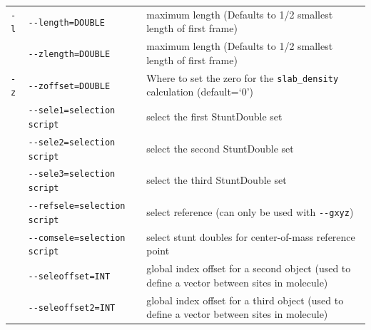 \documentclass[letterpaper]{report}
\begin{document}
\begin{longtable}[c]{|EFG|}
{\tt -l} & {\tt -{}-length=DOUBLE}           &  maximum length (Defaults to 1/2 smallest length of first frame) \\
    & {\tt -{}-zlength=DOUBLE}           &  maximum length (Defaults
                                           to 1/2 smallest length of
                                           first frame) \\
{\tt -z} & {\tt -{}-zoffset=DOUBLE}         & Where to set the zero for the
                                         {\tt slab\_density}
                                  calculation  (default=`0') \\
    & {\tt -{}-sele1=selection script}   & select the first StuntDouble set \\
    & {\tt -{}-sele2=selection script}   & select the second StuntDouble set \\
    & {\tt -{}-sele3=selection script}   & select the third StuntDouble set \\
    & {\tt -{}-refsele=selection script} & select reference (can only
    be used with {\tt -{}-gxyz}) \\
    & {\tt -{}-comsele=selection script}
                               & select stunt doubles for center-of-mass 
                                  reference point\\
    & {\tt -{}-seleoffset=INT}        & global index offset for a second object (used 
                                  to define a vector between sites in molecule)\\
    & {\tt -{}-seleoffset2=INT}        & global index offset for a third object (used 
                                  to define a vector between sites in molecule)\\


\end{longtable}
\end{document}
